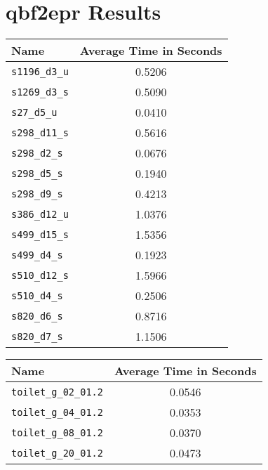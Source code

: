\section{qbf2epr Results}

\begin{center}
\begin{tabular}{| l | S[table-format=3.2] |}
\hline
\textbf{Name} & \textbf{Average Time in Seconds} \\ \hline
\texttt{s1196\_d3\_u} & 0.5206 \\
\texttt{s1269\_d3\_s} & 0.5090 \\
\texttt{s27\_d5\_u} & 0.0410 \\
\texttt{s298\_d11\_s} & 0.5616 \\
\texttt{s298\_d2\_s} & 0.0676 \\
\texttt{s298\_d5\_s} & 0.1940 \\
\texttt{s298\_d9\_s} & 0.4213 \\
\texttt{s386\_d12\_u} & 1.0376 \\
\texttt{s499\_d15\_s} & 1.5356 \\
\texttt{s499\_d4\_s} &  0.1923\\
\texttt{s510\_d12\_s} & 1.5966 \\
\texttt{s510\_d4\_s} & 0.2506 \\
\texttt{s820\_d6\_s} & 0.8716 \\
\texttt{s820\_d7\_s} & 1.1506 \\
\hline
\end{tabular}
\end{center}

\begin{center}
\begin{tabular}{| l | c |}
\hline
\textbf{Name} & \textbf{Average Time in Seconds} \\ \hline
\texttt{toilet\_g\_02\_01.2} & 0.0546 \\
\texttt{toilet\_g\_04\_01.2} & 0.0353 \\
\texttt{toilet\_g\_08\_01.2} & 0.0370 \\
\texttt{toilet\_g\_20\_01.2} & 0.0473 \\
\hline
\end{tabular}
\end{center}
